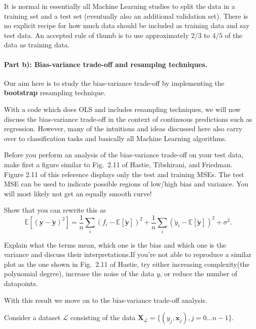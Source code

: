 \documentclass[%
oneside,                 %
final,                   %
10pt]{article}
\begin{document}
It is normal in essentially all Machine Learning studies to split the
data in a training set and a test set (eventually  also an additional
validation set).  There
is no explicit recipe for how much data should be included as training
data and say test data.  An accepted rule of thumb is to use
approximately $2/3$ to $4/5$ of the data as training data.






\paragraph{Part b): Bias-variance trade-off and resamplng techniques.}
Our aim here is to study the bias-variance trade-off by implementing the \textbf{bootstrap} resampling technique.

With a code which does OLS and includes resampling techniques, 
we will now discuss the bias-variance trade-off in the context of
continuous predictions such as regression. However, many of the
intuitions and ideas discussed here also carry over to classification
tasks and basically all Machine Learning algorithms. 

Before you perform an analysis of the bias-variance trade-off on your
test data, make first a figure similar to Fig.~2.11 of Hastie,
Tibshirani, and Friedman. Figure 2.11 of this reference displays only
the test and training MSEs. The test MSE can be used to indicate
possible regions of low/high bias and variance. You will most likely
not get an equally smooth curve!

Show that you can rewrite  this as
\[
\mathbb{E}\left[(\bm{y}-\bm{\tilde{y}})^2\right]=\frac{1}{n}\sum_i(f_i-\mathbb{E}\left[\bm{\tilde{y}}\right])^2+\frac{1}{n}\sum_i(\tilde{y}_i-\mathbb{E}\left[\bm{\tilde{y}}\right])^2+\sigma^2.
\]

Explain what the terms mean, which one is the bias and which one is
the variance and discuss their interpretations.If you're not able to reproduce a similar plot as the one shown in
Fig.~2.11 of Hastie, try either increasing complexity(the polynomial
degree), increase the noise of the data $y$, or reduce the number of
datapoints.



With this result we move on to the bias-variance trade-off analysis.

Consider a
dataset $\mathcal{L}$ consisting of the data
$\mathbf{X}_\mathcal{L}=\{(y_j, \boldsymbol{x}_j), j=0\ldots n-1\}$.
\end{document}
